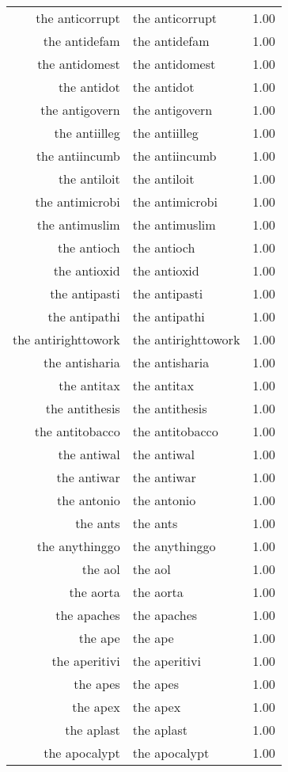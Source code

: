 \begin{table}[ht]
\begin{tabular}{rlr}
  the anticorrupt & the anticorrupt & 1.00 \\ 
  the antidefam & the antidefam & 1.00 \\ 
  the antidomest & the antidomest & 1.00 \\ 
  the antidot & the antidot & 1.00 \\ 
  the antigovern & the antigovern & 1.00 \\ 
  the antiilleg & the antiilleg & 1.00 \\ 
  the antiincumb & the antiincumb & 1.00 \\ 
  the antiloit & the antiloit & 1.00 \\ 
  the antimicrobi & the antimicrobi & 1.00 \\ 
  the antimuslim & the antimuslim & 1.00 \\ 
  the antioch & the antioch & 1.00 \\ 
  the antioxid & the antioxid & 1.00 \\ 
  the antipasti & the antipasti & 1.00 \\ 
  the antipathi & the antipathi & 1.00 \\ 
  the antirighttowork & the antirighttowork & 1.00 \\ 
  the antisharia & the antisharia & 1.00 \\ 
  the antitax & the antitax & 1.00 \\ 
  the antithesis & the antithesis & 1.00 \\ 
  the antitobacco & the antitobacco & 1.00 \\ 
  the antiwal & the antiwal & 1.00 \\ 
  the antiwar & the antiwar & 1.00 \\ 
  the antonio & the antonio & 1.00 \\ 
  the ants & the ants & 1.00 \\ 
  the anythinggo & the anythinggo & 1.00 \\ 
  the aol & the aol & 1.00 \\ 
  the aorta & the aorta & 1.00 \\ 
  the apaches & the apaches & 1.00 \\ 
  the ape & the ape & 1.00 \\ 
  the aperitivi & the aperitivi & 1.00 \\ 
  the apes & the apes & 1.00 \\ 
  the apex & the apex & 1.00 \\ 
  the aplast & the aplast & 1.00 \\ 
  the apocalypt & the apocalypt & 1.00 \\ 

\end{tabular}
\end{table}
